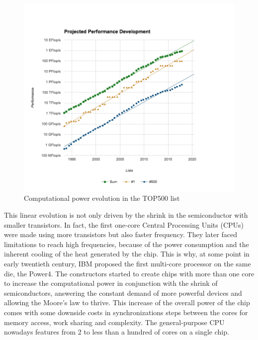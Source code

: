 \begin{figure}
\includegraphics[width=\linewidth]{figures/introduction/top500_list_approximation.png}
\caption{Computational power evolution in the TOP500 list}
\label{fig:intro_top500}
\end{figure}

This linear evolution is not only driven by the shrink in the semiconductor with smaller transistors.
In fact, the first one-core Central Processing Units (CPUs) were made using more transistors but also faster frequency.
They later faced limitations to reach high frequencies, because of the power consumption and the inherent cooling of the heat generated by the chip.
This is why, at some point in early twentieth century, IBM proposed the first multi-core processor on the same die, the Power4.
The constructors started to create chips with more than one core to increase the computational power in conjunction with the shrink of semiconductors, answering the constant demand of more powerful devices and allowing the Moore's law to thrive. 
This increase of the overall power of the chip comes with some downside costs in synchronizations steps between the cores for memory access, work sharing and complexity.
The general-purpose CPU nowadays features from 2 to less than a hundred of cores on a single chip.\\

